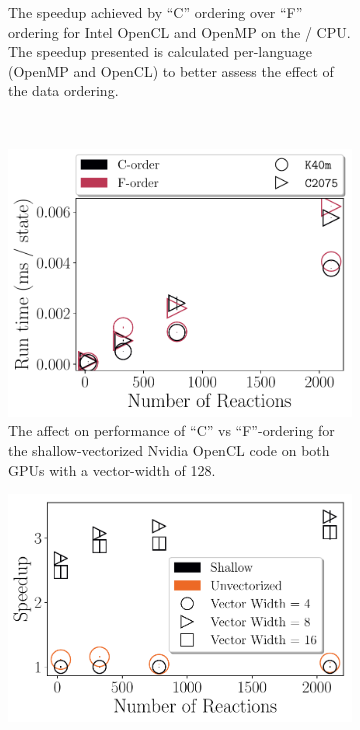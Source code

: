 \documentclass[12pt,number,sort&compress,preprint]{elsarticle}
\begin{document}
\begin{figure}[htbp]
\begin{subfigure}[t]{0.48\linewidth}
      \caption{The speedup achieved by ``C'' ordering over ``F'' ordering for Intel OpenCL and OpenMP on the \avx/ CPU.  The speedup presented is calculated per-language (OpenMP and OpenCL) to better assess the effect of the data ordering.}
      \label{F:source_cvsf}
  \end{subfigure}
  \\
  \begin{subfigure}[t]{0.48\linewidth}
      \includegraphics[width=\textwidth]{source_gpu_cvsf.pdf}
      \caption{The affect on performance of ``C'' vs ``F''-ordering for the shallow-vectorized Nvidia OpenCL code on both GPUs with a vector-width of \num{128}.}
      \label{F:source_gpu_cvsf}
  \end{subfigure}
  \hfill
  \begin{subfigure}[t]{0.48\linewidth}
      \includegraphics[width=\textwidth]{source_vector_width.pdf}

\end{subfigure}
\end{figure}
\end{document}
